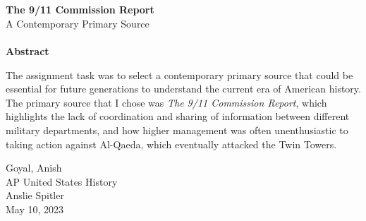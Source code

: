 \begin{titlepage}
\begin{center}




~\\[2.5cm]

\HRule \\[0.4cm]
{ \Large \bfseries The 9/11 Commission Report}\\
{   A Contemporary Primary Source}\\[0.4cm]

\HRule \\[0.5cm]



\textbf{Abstract} \\

\begin{flushleft}
\begin{spacing}{1.0}

{\small
The assignment task was to select a contemporary primary source that could be essential for future generations to understand the current era of American history. The primary source that I chose was \textit{The 9/11 Commission Report}, which highlights the lack of coordination and sharing of information between different military departments, and how higher management was often unenthusiastic to taking action against Al-Qaeda, which eventually attacked the Twin Towers.}\\

\end{spacing}
\end{flushleft}

\vfill

\begin{flushright}
\large {Goyal, Anish \\}
\large AP United States History \\
\large Anslie Spitler\\
{\large May 10, 2023}
\end{flushright}

\end{center}
\end{titlepage}